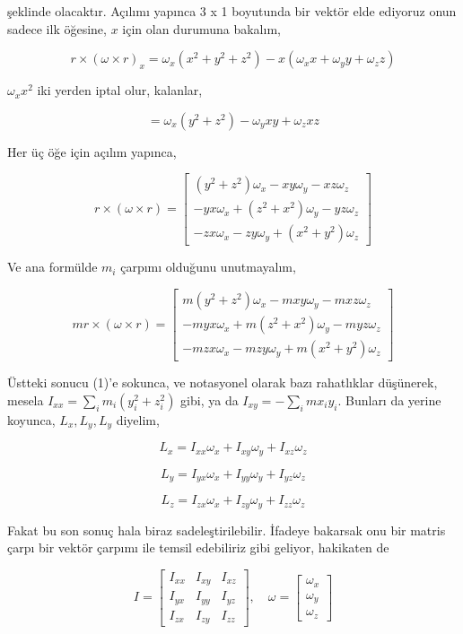 \documentclass[12pt,fleqn]{article}\usepackage{../../common}
\begin{document}
şeklinde olacaktır. Açılımı yapınca 3 x 1 boyutunda bir vektör elde ediyoruz
onun sadece ilk öğesine, $x$ için olan durumuna bakalım,

$$
r \times (\omega \times r)_x = \omega_x (x^2 + y^2 + z^2) - x(\omega_x x + \omega_y y + \omega_z z)
$$

$\omega_x x^2$ iki yerden iptal olur, kalanlar,

$$
 = \omega_x ( y^2 + z^2) - \omega_y xy + \omega_z xz
$$

Her üç öğe için açılım yapınca,

$$
r \times (\omega \times r) =
\left[\begin{array}{c}
(y^2 + z^2) \omega_x - xy \omega_y - xz \omega_z \\
-yx \omega_x + (z^2 + x^2)\omega_y - yz \omega_z \\    
-zx \omega_x - zy \omega_y + (x^2+y^2)\omega_z
\end{array}\right]
$$

Ve ana formülde $m_i$ çarpımı olduğunu unutmayalım,

$$
m r \times (\omega \times r) =
\left[\begin{array}{c}
m (y^2 + z^2) \omega_x - m xy \omega_y - m xz \omega_z \\
-m yx \omega_x + m (z^2 + x^2)\omega_y - m yz \omega_z \\    
-m zx \omega_x - m zy \omega_y + m (x^2+y^2)\omega_z
\end{array}\right]
$$

Üstteki sonucu (1)'e sokunca, ve notasyonel olarak bazı rahatlıklar düşünerek,
mesela $I_{xx} = \sum_i m_i (y_i^2 + z_i^2)$ gibi, ya da $I_{xy} = - \sum_i m x_i y_i$.
Bunları da yerine koyunca, $L_x,L_y,L_y$ diyelim,

$$
L_x = I_{xx} \omega_x + I_{xy} \omega_y + I_{xz} \omega_z
$$

$$
L_y = I_{yx} \omega_x + I_{yy} \omega_y + I_{yz} \omega_z
$$

$$
L_z = I_{zx} \omega_x + I_{zy} \omega_y + I_{zz} \omega_z
$$

Fakat bu son sonuç hala biraz sadeleştirilebilir. İfadeye bakarsak onu bir
matris çarpı bir vektör çarpımı ile temsil edebiliriz gibi geliyor,
hakikaten de

$$
I = \left[\begin{array}{ccc}
I_{xx} & I_{xy} & I_{xz} \\
I_{yx} & I_{yy} & I_{yz} \\
I_{zx} & I_{zy} & I_{zz} 
\end{array}\right], \quad
\omega = \left[\begin{array}{c}
\omega_x \\ \omega_y \\ \omega_z
\end{array}\right]
$$
\end{document}
